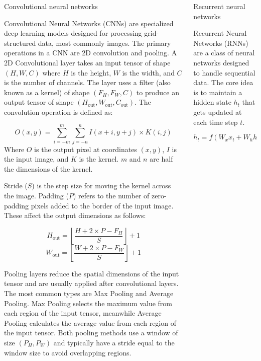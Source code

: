 \documentclass{beamer}
\begin{document}
\begin{columns}
\begin{column}{0.3\textwidth}
\begin{block}{Convolutional neural networks}

Convolutional Neural Networks (CNNs) are specialized deep learning models designed for processing grid-structured data, most commonly images. The primary operations in a CNN are 2D convolution and pooling. A 2D Convolutional layer takes an input tensor of shape $(H, W, C)$ where $H$ is the height, $W$ is the width, and $C$ is the number of channels. The layer uses a filter (also known as a kernel) of shape $(F_H, F_W, C)$ to produce an output tensor of shape $(H_{\text{out}}, W_{\text{out}}, C_{\text{out}})$. The convolution operation is defined as:

\[
O(x, y) = \sum_{i=-m}^{m} \sum_{j=-n}^{n} I(x+i, y+j) \times K(i, j)
\]
Where $O$ is the output pixel at coordinates $(x, y)$, $I$ is the input image, and $K$ is the kernel. $m$ and $n$ are half the dimensions of the kernel.

Stride ($S$) is the step size for moving the kernel across the image. Padding ($P$) refers to the number of zero-padding pixels added to the border of the input image. These affect the output dimensions as follows:

\[
H_{\text{out}} = \left\lfloor \frac{H + 2 \times P - F_H}{S} \right\rfloor + 1
\]
\[
W_{\text{out}} = \left\lfloor \frac{W + 2 \times P - F_W}{S} \right\rfloor + 1
\]

Pooling layers reduce the spatial dimensions of the input tensor and are usually applied after convolutional layers. The most common types are Max Pooling and Average Pooling. Max Pooling selects the maximum value from each region of the input tensor, meanwhile Average Pooling calculates the average value from each region of the input tensor. Both pooling methods use a window of size $(P_H, P_W)$ and typically have a stride equal to the window size to avoid overlapping regions.

\end{block} 

\end{column}
\begin{column}{0.3\textwidth}

\begin{block}{Recurrent neural networks}

Recurrent Neural Networks (RNNs) are a class of neural networks designed to handle sequential data. The core idea is to maintain a hidden state $h_t$ that gets updated at each time step $t$.

\[
h_t = f(W_x x_t + W_h h_{t-1} + b)
\]


\end{block}
\end{column}
\end{columns}
\end{document}
